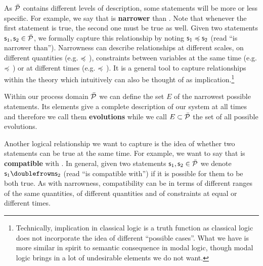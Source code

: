 \documentclass[letterpaper]{article}
\begin{document}
As $\tdomain[P]$ contains different levels of description, some statements will be more or less specific. For example, we say that  is \textbf{narrower} than . Note that whenever the first statement is true, the second one must be true as well. Given two statements $\stmt_1, \stmt_2 \in \tdomain[P]$, we formally capture this relationship by noting $\stmt_1 \narrower \stmt_2$ (read ``is narrower than''). Narrowness can describe relationships at different scales, on different quantities (e.g.  $\narrower$ ), constraints between variables at the same time (e.g.  $\narrower$ ) or at different times (e.g.  $\narrower$ ). It is a general tool to capture relationships within the theory which intuitively can also be thought of as implication.\footnote{Technically, implication in classical logic is a truth function as classical logic does not incorporate the idea of different ``possible cases''. What we have is more similar in spirit to semantic consequence in modal logic, though modal logic brings in a lot of undesirable elements we do not want.}

Within our process domain $\tdomain[P]$ we can define the set $E$ of the narrowest possible statements. Its elements give a complete description of our system at all times and therefore we call them \textbf{evolutions} while we call $E \subset \tdomain[P]$ the set of all possible evolutions.

Another logical relationship we want to capture is the idea of whether two statements can be true at the same time. For example, we want to say that  is \textbf{compatible} with . In general, given two statements $\stmt_1, \stmt_2 \in \tdomain[P]$ we denote $\stmt_1 \comp \stmt_2$ (read ``is compatible with'') if it is possible for them to be both true. As with narrowness, compatibility can be in terms of different ranges of the same quantities, of different quantities and of constraints at equal or different times.
\end{document}
